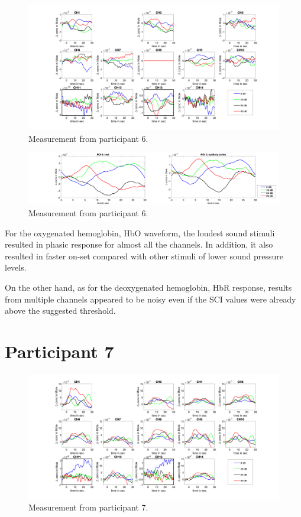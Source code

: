 \begin{figure}[H]
  \centering
    \includegraphics[scale=.4]{bilder/HbR_Mole/sub_shelia_s_HbR.png}
  \caption{Measurement from participant 6.}
  \label{fig:somesignal}
\end{figure}

\begin{figure}[H]
  \centering
    \includegraphics[scale=.29]{bilder/ROI/sub_shelia_s_HbO.png}
  \caption{Measurement from participant  6.}
\end{figure}

For the oxygenated hemoglobin, \acrshort{HbO} waveform, the loudest sound stimuli resulted in phasic response for almost all the channels. In addition, it also resulted in faster on-set compared with other stimuli of lower sound pressure levels.

On the other hand, as for the deoxygenated hemoglobin, \acrshort{HbR} response, results from multiple channels appeared to be noisy even if the SCI values were already above the suggested threshold.

\newpage





\section {Participant 7}
\begin{figure}[H]
  \centering
    \includegraphics[scale=.4]{bilder/HbO_Mole/sub_liao_s_HbO.png}
  \caption{Measurement from participant 7.}
  \label{fig:somesignal}
\end{figure}

